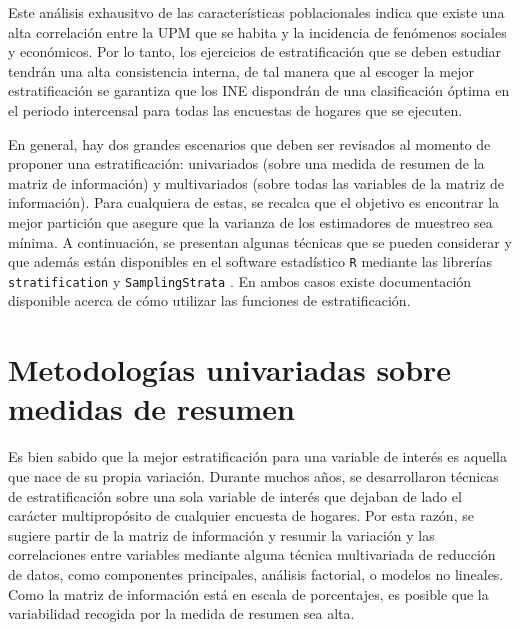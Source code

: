 \documentclass[
  10pt,
  spanish,
]{book}
\begin{document}
Este análisis exhausitvo de las características poblacionales indica que existe una alta correlación entre la UPM que se habita y la incidencia de fenómenos sociales y económicos. Por lo tanto, los ejercicios de estratificación que se deben estudiar tendrán una alta consistencia interna, de tal manera que al escoger la mejor estratificación se garantiza que los INE dispondrán de una clasificación óptima en el periodo intercensal para todas las encuestas de hogares que se ejecuten.

En general, hay dos grandes escenarios que deben ser revisados al momento de proponer una estratificación: univariados (sobre una medida de resumen de la matriz de información) y multivariados (sobre todas las variables de la matriz de información). Para cualquiera de estas, se recalca que el objetivo es encontrar la mejor partición que asegure que la varianza de los estimadores de muestreo sea mínima. A continuación, se presentan algunas técnicas que se pueden considerar y que además están disponibles en el software estadístico \texttt{R} mediante las librerías \texttt{stratification} \citep{Baillargeon_Rivest_2011} y \texttt{SamplingStrata} \citep{Barcaroli_2014}. En ambos casos existe documentación disponible acerca de cómo utilizar las funciones de estratificación.

\hypertarget{metodologuxedas-univariadas-sobre-medidas-de-resumen}{%
\section{Metodologías univariadas sobre medidas de resumen}\label{metodologuxedas-univariadas-sobre-medidas-de-resumen}}

Es bien sabido que la mejor estratificación para una variable de interés es aquella que nace de su propia variación. Durante muchos años, se desarrollaron técnicas de estratificación sobre una sola variable de interés que dejaban de lado el carácter multipropósito de cualquier encuesta de hogares. Por esta razón, se sugiere partir de la matriz de información y resumir la variación y las correlaciones entre variables mediante alguna técnica multivariada de reducción de datos, como componentes principales, análisis factorial, o modelos no lineales. Como la matriz de información está en escala de porcentajes, es posible que la variabilidad recogida por la medida de resumen sea alta.
\end{document}
